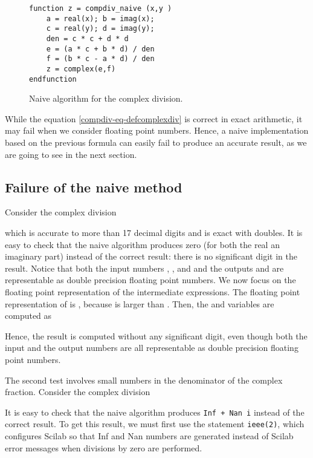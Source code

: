\documentclass{paper}
\newcommand{\scifun}[1]{\texttt{#1}}
\newcommand{\scivar}[1]{\texttt{#1}}
\begin{document}
\begin{figure}
\caption{Naive algorithm for the complex division.}
\label{fig-compdiv-algonaive}
\lstset{language=scilabscript}
\begin{lstlisting}
function z = compdiv_naive (x,y )
    a = real(x); b = imag(x);
    c = real(y); d = imag(y);
    den = c * c + d * d
    e = (a * c + b * d) / den
    f = (b * c - a * d) / den
    z = complex(e,f)
endfunction
\end{lstlisting}
\end{figure}


While the equation \ref{compdiv-eq-defcomplexdiv} is correct  
in exact arithmetic, it may fail when we consider floating point 
numbers. 
Hence, a naive implementation based on the previous 
formula can easily fail to produce an accurate result, as 
we are going to see in the next section. 

\subsection{Failure of the naive method}
\label{section-naivefailures}

Consider the complex division 

which is accurate to more than 17 decimal digits and 
is exact with doubles.
It is easy to check that the naive algorithm produces zero (for 
both the real an imaginary part) instead of the 
correct result: there is no significant digit in the result. 
Notice that both the input numbers , ,  and  and the 
outputs  and  are representable as double precision
floating point numbers. 
We now focus on the floating point representation of the intermediate expressions.
The floating point representation of  is ,
because  is larger than . 
Then, the  and  variables are computed as 

Hence, the result is computed without any significant digit,
even though both the input and the output numbers are all representable as double precision
floating point numbers.

The second test involves small numbers in the denominator of the complex fraction.
Consider the complex division 

It is easy to check that the naive algorithm produces \scivar{Inf + Nan i} instead 
of the correct result. 
To get this result, we must first use the statement \scifun{ieee(2)}, which configures 
Scilab so that Inf and Nan numbers are generated instead 
of Scilab error messages when divisions by zero are performed. 
\end{document}
